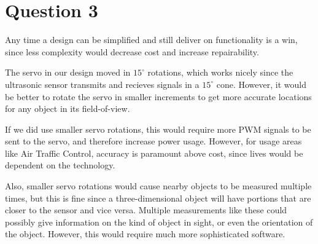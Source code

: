 \documentclass{IEEEtran}
\begin{document}
\section{Question 3}

Any time a design can be simplified and still deliver on functionality is a win, since less complexity would decrease cost and increase repairability.

The servo in our design moved in \(15^\circ\) rotations, which works nicely since the ultrasonic sensor transmits and recieves signals in a \(15^\circ\) cone. However, it would be better to rotate the servo in smaller increments to get more accurate locations for any object in its field-of-view.

If we did use smaller servo rotations, this would require more PWM signals to be sent to the servo, and therefore increase power usage. However, for usage areas like Air Traffic Control, accuracy is paramount above cost, since lives would be dependent on the technology.

Also, smaller servo rotations would cause nearby objects to be measured multiple times, but this is fine since a three-dimensional object will have portions that are closer to the sensor and vice versa. Multiple measurements like these could possibly give information on the kind of object in sight, or even the orientation of the object. However, this would require much more sophisticated software.
\end{document}
